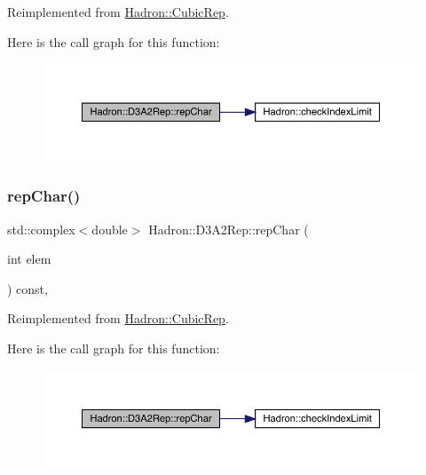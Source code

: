 Reimplemented from \mbox{\hyperlink{structHadron_1_1CubicRep_af45227106e8e715e84b0af69cd3b36f8}{Hadron\+::\+Cubic\+Rep}}.

Here is the call graph for this function\+:
\nopagebreak
\begin{figure}[H]
\begin{center}
\leavevmode
\includegraphics[width=350pt]{d5/d7f/structHadron_1_1D3A2Rep_a89c199bea81c3c1da8687a5cbd7498c0_cgraph}
\end{center}
\end{figure}
\mbox{\label{structHadron_1_1D3A2Rep_a89c199bea81c3c1da8687a5cbd7498c0}} 
\subsubsection{\texorpdfstring{repChar()}{repChar()}\hspace{0.1cm}{\footnotesize\ttfamily [3/3]}}
{\footnotesize\ttfamily std\+::complex$<$double$>$ Hadron\+::\+D3\+A2\+Rep\+::rep\+Char (\begin{DoxyParamCaption}\item[{int}]{elem }\end{DoxyParamCaption}) const\hspace{0.3cm}{\ttfamily [inline]}, {\ttfamily [virtual]}}



Reimplemented from \mbox{\hyperlink{structHadron_1_1CubicRep_af45227106e8e715e84b0af69cd3b36f8}{Hadron\+::\+Cubic\+Rep}}.

Here is the call graph for this function\+:
\nopagebreak
\begin{figure}[H]
\begin{center}
\leavevmode
\includegraphics[width=350pt]{d5/d7f/structHadron_1_1D3A2Rep_a89c199bea81c3c1da8687a5cbd7498c0_cgraph}
\end{center}
\end{figure}
\mbox{\label{structHadron_1_1D3A2Rep_a0e868a4c14c9126108a49d429add3c94}} 
